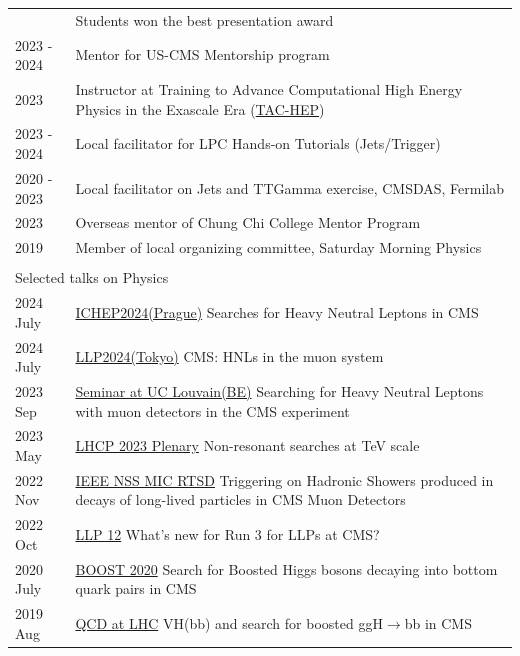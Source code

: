 \documentclass[letterpaper,11pt,oneside]{article}
\begin{document}
{\begin{tabular}{p{0.12\linewidth}  p{0.88\linewidth}}
      & Students won the best presentation award\\
 2023 - 2024 & Mentor for US-CMS Mentorship program \\
 2023 & Instructor at Training to Advance Computational High Energy Physics in the Exascale Era (\href{https://tac-hep.org/}{TAC-HEP})\\
 2023 - 2024 & Local facilitator for LPC Hands-on Tutorials (Jets/Trigger)\\
 2020 - 2023 & Local facilitator on Jets and TTGamma exercise, CMSDAS, Fermilab    \\
 2023 & Overseas mentor of Chung Chi College Mentor Program \\ 
 2019 & Member of local organizing committee, Saturday Morning Physics  \\
&\\

\multicolumn{2}{l}{ \Large{Selected talks on Physics} }   \\ \hline
2024 July& \href{https://indico.cern.ch/event/1291157/timetable/?view=standard#188-searches-for-heavy-neutral}{ICHEP2024(Prague)}  Searches for Heavy Neutral Leptons in CMS\\
2024 July& \href{https://indico.cern.ch/event/1381368/timetable/?view=standard#59-cms-hnls-in-the-muon-system}{LLP2024(Tokyo)} CMS: HNLs in the muon system \\
2023 Sep & \href{https://agenda.irmp.ucl.ac.be/event/4999/}{Seminar at UC Louvain(BE)} Searching for Heavy Neutral Leptons with muon detectors in the CMS experiment \\
2023 May & \href{https://indico.cern.ch/event/1198609/contributions/5316842/}{LHCP 2023 Plenary}  Non-resonant searches at TeV scale \\
2022 Nov & \href{https://nssmic.ieee.org/2022/information/#conference-poster}{IEEE NSS MIC RTSD}  Triggering on Hadronic Showers produced in decays of long-lived particles in CMS Muon Detectors\\
2022 Oct & \href{https://indico.cern.ch/event/1166678/timetable/?view=standard#38-whats-new-for-run-3-for-llp}{LLP 12}  What's new for Run 3 for LLPs at CMS?\\
2020 July         & \href{https://indico.cern.ch/event/775951/contributions/3946570/}{BOOST 2020}  Search for Boosted Higgs bosons decaying into bottom quark pairs in CMS\\
2019 Aug         & \href{https://indico.fnal.gov/event/19380/timetable/?view=standard#121-vhbb-and-search-for-booste}  {QCD at LHC} VH(bb) and search for boosted ggH$\to$bb in CMS \\


\end{tabular}}
\end{document}
